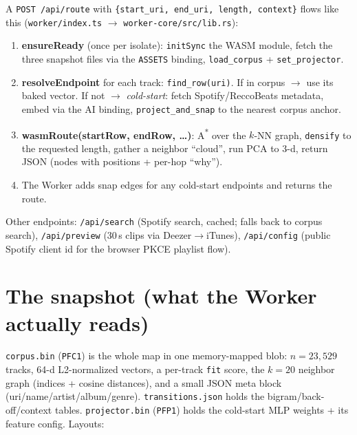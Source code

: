 \documentclass[11pt]{article}
\newcommand{\file}[1]{\texttt{\small #1}}
\newcommand{\code}[1]{\texttt{\small #1}}
\begin{document}
A \file{POST /api/route} with \code{\{start\_uri, end\_uri, length, context\}} flows like this
(\file{worker/index.ts} $\rightarrow$ \file{worker-core/src/lib.rs}):

\begin{enumerate}[leftmargin=1.5em,itemsep=2pt]
\item \textbf{ensureReady} (once per isolate): \code{initSync} the WASM module, fetch the three
snapshot files via the \code{ASSETS} binding, \code{load\_corpus} + \code{set\_projector}.
\item \textbf{resolveEndpoint} for each track: \code{find\_row(uri)}. If in corpus $\rightarrow$ use
its baked vector. If not $\rightarrow$ \emph{cold-start}: fetch Spotify/ReccoBeats metadata, embed via
the AI binding, \code{project\_and\_snap} to the nearest corpus anchor.
\item \textbf{wasmRoute(startRow, endRow, \dots)}: A\textsuperscript{*} over the $k$-NN graph,
\code{densify} to the requested length, gather a neighbor ``cloud'', run PCA to 3-d, return JSON
(nodes with positions + per-hop ``why'').
\item The Worker adds snap edges for any cold-start endpoints and returns the route.
\end{enumerate}

Other endpoints: \file{/api/search} (Spotify search, cached; falls back to corpus search),
\file{/api/preview} (30\,s clips via Deezer$\rightarrow$iTunes), \file{/api/config} (public Spotify
client id for the browser PKCE playlist flow).

\section{The snapshot (what the Worker actually reads)}

\file{corpus.bin} (\code{PFC1}) is the whole map in one memory-mapped blob: $n{=}23{,}529$ tracks,
64-d L2-normalized vectors, a per-track \code{fit} score, the $k{=}20$ neighbor graph (indices +
cosine distances), and a small JSON meta block (uri/name/artist/album/genre). \file{transitions.json}
holds the bigram/back-off/context tables. \file{projector.bin} (\code{PFP1}) holds the cold-start
MLP weights + its feature config. Layouts:
\end{document}
